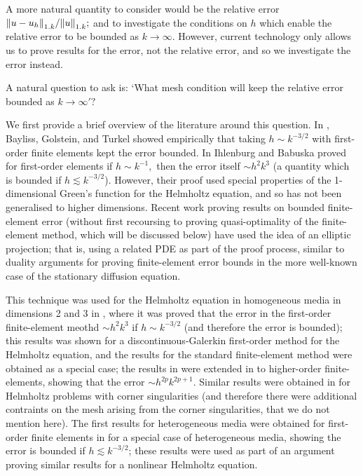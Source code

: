 A more natural quantity to consider would be the relative error $\NW{u-\uh}/\NW{u};$ and to investigate the conditions on $h$ which enable the relative error to be bounded as $k\rightarrow \infty.$ However, current technology only allows us to prove results for the error, not the relative error, and so we investigate the error instead.

A natural question to ask is: `What mesh condition will keep the relative error bounded as $k \rightarrow \infty'?$

We first provide a brief overview of the literature around this question. In \cite{BaGoTu:85}, Bayliss, Golstein, and Turkel showed empirically that taking $h \sim k^{-3/2}$ with first-order finite elements kept the error bounded. In \cite{IhBa} Ihlenburg and Babuska proved for first-order elements if $h \sim k^{-1},$ then the error itself $\sim h^2 k^3$ (a quantity which is bounded if $h \lesssim k^{-3/2}$). However, their proof used special properties of the 1-dimensional Green's function for the Helmholtz equation, and so has not been generalised to higher dimensions. Recent work proving results on bounded finite-element error (without first recoursing to proving quasi-optimality of the finite-element method, which will be discussed below) have used the idea of an elliptic projection; that is, using a related PDE as part of the proof process, similar to duality arguments for proving finite-element error bounds in the more well-known case of the stationary diffusion equation.

This technique was used for the Helmholtz equation in homogeneous media in dimensions 2 and 3 in \cite{Wu:14}, where it was proved that the error in the first-order finite-element meothd $\sim h^2k^3$ if $h \sim k^{-3/2}$ (and therefore the error is bounded); this results was shown for a discontinuous-Galerkin first-order method for the Helmholtz equation, and the results for the standard finite-element method were obtained as a special case; the results in \cite{Wu:14} were extended in \cite{DuWu:15} to higher-order finite-elements, showing that the error $\sim h^{2p}k^{2p+1}.$ Similar results were obtained in \cite{ChNi:18} for Helmholtz problems with corner singularities (and therefore there were additional contraints on the mesh arising from the corner singularities, that we do not mention here). The first results for heterogeneous media were obtained for first-order finite elements in \cite[Lemma 3.3]{WuZo:18} for a special case of heterogeneous media, showing the error is bounded if $h \lesssim k^{-3/2}$; these results were used as part of an argument proving similar results for a nonlinear Helmholtz equation.

